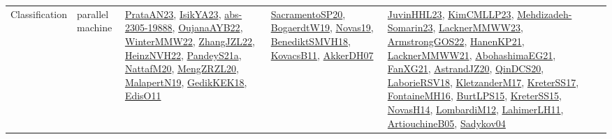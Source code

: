 {\begin{longtable}{llp{6cm}p{6cm}p{6cm}}
Classification & parallel machine & \href{articles/PrataAN23.pdf}{PrataAN23}\cite{PrataAN23}, \href{articles/IsikYA23.pdf}{IsikYA23}\cite{IsikYA23}, \href{articles/abs-2305-19888.pdf}{abs-2305-19888}\cite{abs-2305-19888}, \href{papers/OujanaAYB22.pdf}{OujanaAYB22}\cite{OujanaAYB22}, \href{papers/WinterMMW22.pdf}{WinterMMW22}\cite{WinterMMW22}, \href{papers/ZhangJZL22.pdf}{ZhangJZL22}\cite{ZhangJZL22}, \href{articles/HeinzNVH22.pdf}{HeinzNVH22}\cite{HeinzNVH22}, \href{articles/PandeyS21a.pdf}{PandeyS21a}\cite{PandeyS21a}, \href{papers/NattafM20.pdf}{NattafM20}\cite{NattafM20}, \href{articles/MengZRZL20.pdf}{MengZRZL20}\cite{MengZRZL20}, \href{papers/MalapertN19.pdf}{MalapertN19}\cite{MalapertN19}, \href{articles/GedikKEK18.pdf}{GedikKEK18}\cite{GedikKEK18}, \href{papers/EdisO11.pdf}{EdisO11}\cite{EdisO11} & \href{articles/SacramentoSP20.pdf}{SacramentoSP20}\cite{SacramentoSP20}, \href{papers/BogaerdtW19.pdf}{BogaerdtW19}\cite{BogaerdtW19}, \href{articles/Novas19.pdf}{Novas19}\cite{Novas19}, \href{papers/BenediktSMVH18.pdf}{BenediktSMVH18}\cite{BenediktSMVH18}, \href{articles/KovacsB11.pdf}{KovacsB11}\cite{KovacsB11}, \href{papers/AkkerDH07.pdf}{AkkerDH07}\cite{AkkerDH07} & \href{papers/JuvinHHL23.pdf}{JuvinHHL23}\cite{JuvinHHL23}, \href{papers/KimCMLLP23.pdf}{KimCMLLP23}\cite{KimCMLLP23}, \href{papers/Mehdizadeh-Somarin23.pdf}{Mehdizadeh-Somarin23}\cite{Mehdizadeh-Somarin23}, \href{articles/LacknerMMWW23.pdf}{LacknerMMWW23}\cite{LacknerMMWW23}, \href{papers/ArmstrongGOS22.pdf}{ArmstrongGOS22}\cite{ArmstrongGOS22}, \href{papers/HanenKP21.pdf}{HanenKP21}\cite{HanenKP21}, \href{papers/LacknerMMWW21.pdf}{LacknerMMWW21}\cite{LacknerMMWW21}, \href{articles/AbohashimaEG21.pdf}{AbohashimaEG21}\cite{AbohashimaEG21}, \href{articles/FanXG21.pdf}{FanXG21}\cite{FanXG21}, \href{articles/AstrandJZ20.pdf}{AstrandJZ20}\cite{AstrandJZ20}, \href{articles/QinDCS20.pdf}{QinDCS20}\cite{QinDCS20}, \href{articles/LaborieRSV18.pdf}{LaborieRSV18}\cite{LaborieRSV18}, \href{papers/KletzanderM17.pdf}{KletzanderM17}\cite{KletzanderM17}, \href{articles/KreterSS17.pdf}{KreterSS17}\cite{KreterSS17}, \href{papers/FontaineMH16.pdf}{FontaineMH16}\cite{FontaineMH16}, \href{papers/BurtLPS15.pdf}{BurtLPS15}\cite{BurtLPS15}, \href{papers/KreterSS15.pdf}{KreterSS15}\cite{KreterSS15}, \href{articles/NovasH14.pdf}{NovasH14}\cite{NovasH14}, \href{articles/LombardiM12.pdf}{LombardiM12}\cite{LombardiM12}, \href{papers/LahimerLH11.pdf}{LahimerLH11}\cite{LahimerLH11}, \href{papers/ArtiouchineB05.pdf}{ArtiouchineB05}\cite{ArtiouchineB05}, \href{papers/Sadykov04.pdf}{Sadykov04}\cite{Sadykov04}\\

\end{longtable}}
